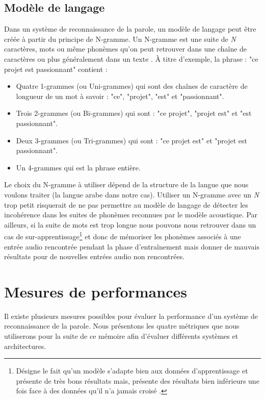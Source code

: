 \subsection{Modèle de langage}
Dans un système de reconnaissance de la parole, un modèle de langage peut être créée à partir du principe de N-gramme. Un N-gramme est une suite de \textit{N} caractères, mots ou même phonèmes qu'on peut retrouver dans une chaîne de caractères ou plus généralement dans un texte \cite{speechlangprocessing}. À titre d'exemple, la phrase : "ce projet est passionnant" contient :
\begin{itemize}
    \item Quatre 1-grammes (ou Uni-grammes) qui sont des chaînes de caractère de longueur de un mot à savoir : "ce", "projet", "est" et "passionnant".
    \item Trois 2-grammes (ou Bi-grammes) qui sont : "ce projet", "projet est" et "est passionnant".
    \item Deux 3-grammes (ou Tri-grammes) qui sont : "ce projet est" et "projet est passionnant".
    \item Un 4-grammes qui est la phrase entière.\\
\end{itemize}

Le choix du N-gramme à utiliser dépend de la structure de la langue que nous voulons traiter (la langue arabe dans notre cas). Utiliser un N-gramme avec un \textit{N} trop petit risquerait de ne pas permettre au modèle de langage de détecter les incohérence dans les suites de phonèmes reconnues par le modèle acoustique. Par ailleurs, si la suite de mots est trop longue nous pouvons nous retrouver dans un cas de sur-apprentissage\footnote{Désigne le fait qu'un modèle s'adapte bien aux données d'apprentissage et présente de très bons résultats mais, présente des résultats bien inférieurs une fois face à des données qu'il n'a jamais croisé \cite{underoverfitting}.} et donc de mémoriser les phonèmes associés à une entrée audio rencontrée pendant la phase d'entraînement mais donner de mauvais résultats pour de nouvelles entrées audio non rencontrées.

\section{Mesures de performances}

Il existe plusieurs mesures possibles pour évaluer la performance d'un système de reconnaissance de la parole.
Nous présentons les quatre métriques que nous utiliserons pour la suite de ce mémoire afin d'évaluer différents systèmes et architectures.

